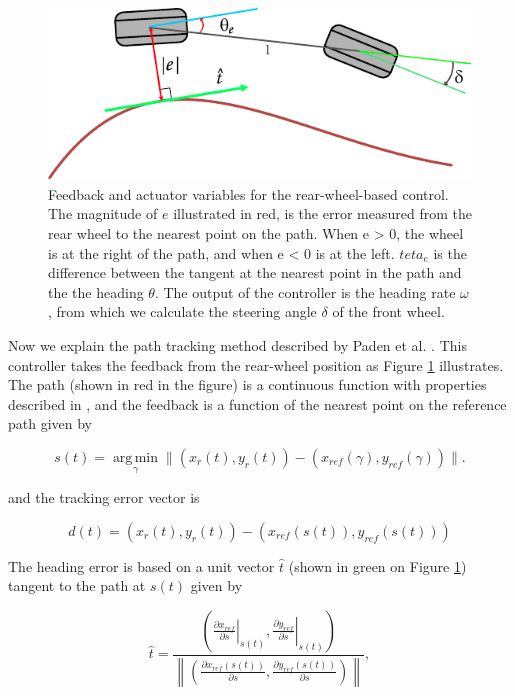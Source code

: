 \documentclass[symmetry,article,submit,moreauthors,pdftex]{Definitions/mdpi}
\begin{document}
\begin{figure}[H] \includegraphics[width=10.5 cm]{img/path} \caption{ Feedback
        and actuator variables for the rear-wheel-based control. The magnitude
        of $e$ illustrated in red, is the error measured from the rear wheel to
        the nearest point on the path. When e > 0, the wheel is at the right of
        the path, and when e < 0 is at the left. $teta_e$ is the
        difference between the tangent at the nearest point in the path and the
        the heading $\theta$. The output of the controller is the heading rate
        $\omega$, from which we calculate the steering angle $\delta$ of the front wheel.
}\label{fig:kinematics}    \end{figure} 

Now we explain the path tracking method described by Paden et al.
\cite{paden_survey_2016}.  This controller takes the feedback from the
rear-wheel position as Figure \ref{fig:kinematics} illustrates.  The path
(shown in red in the figure) is a continuous function with properties
described in \cite{samson1992path}, and the feedback is a function of the
nearest point on the reference path given by 

\begin{equation}
s(t) = \operatorname*{arg\,min}_{\gamma} \|(x_r(t),y_r(t)) - (x_{ref}(\gamma),y_{ref}(\gamma)) \|.
\end{equation}

and the tracking error vector is 

\begin{equation}
d(t) = (x_r(t),y_r(t))-(x_{ref}(s(t)),y_{ref}(s(t)))
\end{equation}

The heading error is based on a unit vector $\hat{t}$ (shown in green on Figure
\ref{fig:kinematics}) tangent to the path at $s(t)$ given by 

\begin{equation}
\hat{t} = \frac{ \left(\left.\frac{\partial x_{ref}}{\partial s} \right|_{s(t)},\left.\frac{\partial y_{ref}}{\partial s} \right|_{s(t)}\right)} 
              {\left\| \left(\frac{\partial x_{ref}(s(t))}{\partial s},\frac{\partial y_{ref}(s(t))}{\partial s}\right) \right\|},
\end{equation}
\end{document}
